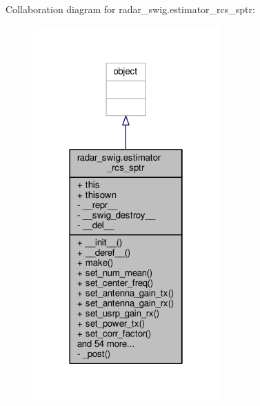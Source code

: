 Collaboration diagram for radar\+\_\+swig.\+estimator\+\_\+rcs\+\_\+sptr\+:
\nopagebreak
\begin{figure}[H]
\begin{center}
\leavevmode
\includegraphics[width=202pt]{dc/d4e/classradar__swig_1_1estimator__rcs__sptr__coll__graph}
\end{center}
\end{figure}
